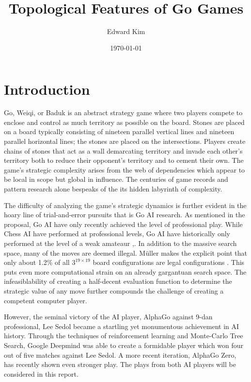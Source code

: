 \documentclass[12pt]{article}
\title{\vspace{-7ex}Topological Features of Go Games \vspace{-2ex}}
\author{Edward Kim}
\date{\vspace{-2ex}\today}
\begin{document}
\maketitle

\section{Introduction}
Go, Weiqi, or Baduk is an abstract strategy game where two players compete to enclose and control as much territory as possible on the board. Stones are placed on a board typically consisting of nineteen parallel vertical lines and  nineteen parallel horizontal lines; the stones are placed on the intersections. Players create chains of stones that act as a wall demarcating territory and invade each other's territory both to reduce their opponent's territory and to cement their own. The game's strategic complexity arises from the web of dependencies which appear to be local in scope but global in influence. The centuries of game records and pattern research alone bespeaks of the its hidden labyrinth of complexity.

The difficulty of analyzing the game's strategic dynamics is further evident in the hoary line of trial-and-error pursuits that is Go AI research. As mentioned in the proposal, Go AI have only recently achieved the level of professional play. While Chess AI have performed at professional levels, Go AI have historically only performed at the level of a weak amateaur \cite{bays},\cite{muller}. In addition to the massive search space, many of the moves are deemed illegal. M{\" u}ller  makes the explicit point that only about 1.2\% of all $3^{19 \times 19}$ board configurations are legal configurations \cite{muller}. This puts even more computational strain on an already gargantuan search space. The infeasiblability of creating a half-decent evaluation function to determine the strategic value of any move further compounds the challenge of creating a competent computer player.

However, the seminal victory of the AI player, AlphaGo against 9-dan professional, Lee Sedol became a startling yet monumentous achievement in AI history. Through the techniques of reinforcement learning and Monte-Carlo Tree Search, Google Deepmind was able to create a formidable player which won four out of five matches against Lee Sedol. \cite{alpha} A more recent iteration, AlphaGo Zero, has recently shown even stronger play. The plays from both AI players will be considered in this report.
\end{document}

